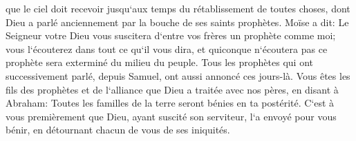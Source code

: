 \verse que le ciel doit recevoir jusqu`aux temps du rétablissement de toutes choses, dont Dieu a parlé anciennement par la bouche de ses saints prophètes. 
\verse Moïse a dit: Le Seigneur votre Dieu vous suscitera d`entre vos frères un prophète comme moi; vous l`écouterez dans tout ce qu`il vous dira, 
\verse et quiconque n`écoutera pas ce prophète sera exterminé du milieu du peuple. 
\verse Tous les prophètes qui ont successivement parlé, depuis Samuel, ont aussi annoncé ces jours-là. 
\verse Vous êtes les fils des prophètes et de l`alliance que Dieu a traitée avec nos pères, en disant à Abraham: Toutes les familles de la terre seront bénies en ta postérité. 
\verse C`est à vous premièrement que Dieu, ayant suscité son serviteur, l`a envoyé pour vous bénir, en détournant chacun de vous de ses iniquités. 

\chapter{}

